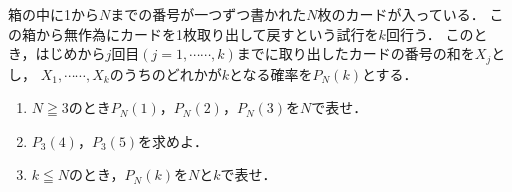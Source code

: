 \documentclass[../../main.tex]{subfiles}
\begin{document}
箱の中に1から$N$までの番号が一つずつ書かれた$N$枚のカードが入っている．
この箱から無作為にカードを1枚取り出して戻すという試行を$k$回行う．
このとき，はじめから$j$回目$(j=1,\cdots\cdots,k)$までに取り出したカードの番号の和を$X_j$とし，
$X_1,\cdots\cdots,X_k$のうちのどれかが$k$となる確率を$P_N(k)$とする．
\begin{enumerate}
  \item $N \geqq 3$のとき$P_N(1)$，$P_N(2)$，$P_N(3)$を$N$で表せ．
  \item $P_3(4)$，$P_3(5)$を求めよ．
  \item $k \leqq N$のとき，$P_N(k)$を$N$と$k$で表せ．
\end{enumerate}
\end{document}
